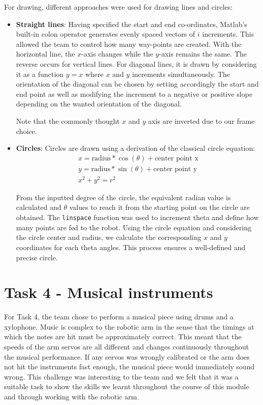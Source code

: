 \documentclass[9pt, a4paper]{article}
\begin{document}
For drawing, different approaches were used for drawing lines and circles:
\begin{itemize}
  \item \textbf{Straight lines}: Having specified the start and end
  co-ordinates, Matlab's built-in colon operator generates evenly spaced vectors
  of $i$ increments. This allowed the team to control how many way-points are
  created. With the horizontal line, the $x$-axis changes while the $y$-axis
  remains the same. The reverse occurs for vertical lines. For diagonal lines, it
  is drawn by considering it as a function $y=x$ where $x$ and $y$ increments
  simultaneously. The orientation of the diagonal can be chosen by setting
  accordingly the start and end point as well as modifying the increment to a
  negative or positive slope depending on the wanted orientation of the
  diagonal.  

  Note that the commonly thought $x$ and $y$ axis are inverted due to our frame
  choice.
\end{itemize}
\begin{itemize}
  \item \textbf{Circles}: Circles are drawn using a derivation of the classical circle
  equation:
  \begin{gather*}
    x = \text{radius} * \cos(\theta) + \text{center point x} \\
    y = \text{radius} * \sin(\theta) + \text{center point y} \\
    x^2 + y^2 = r^2
  \end{gather*}

  From the inputted degree of the circle, the equivalent radian value is calculated
  and $\theta$ values to reach it from the starting point on the 
  circle are obtained. The \verb+linspace+ function was used to increment theta and
  define how many points are fed to the robot. Using the circle equation and
  considering the circle center and radius, we calculate the corresponding $x$ and
  $y$ coordinates for each theta angles. This process ensures a well-defined and
  precise circle.  
\end{itemize}

\section{Task 4 - Musical instruments}

For Task 4, the team chose to perform a musical piece using drums and a
xylophone. Music is complex to the robotic arm in the sense that the timings at
which the notes are hit must be approximately correct. This meant that the
speeds of the arm servos are all different and changes continuously throughout
the musical performance. If any servos was wrongly calibrated or the arm does
not hit the instruments fast enough, the musical piece would immediately sound
wrong. This challenge was interesting to the team and we
felt that it was a suitable task to show the skills we learnt throughout the
course of this module and through working with the robotic arm. 
\end{document}
